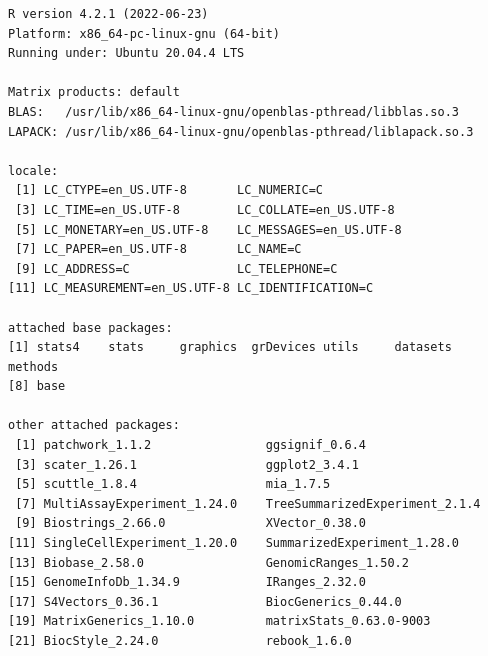 \documentclass[
]{book}
\begin{document}
\begin{verbatim}
R version 4.2.1 (2022-06-23)
Platform: x86_64-pc-linux-gnu (64-bit)
Running under: Ubuntu 20.04.4 LTS

Matrix products: default
BLAS:   /usr/lib/x86_64-linux-gnu/openblas-pthread/libblas.so.3
LAPACK: /usr/lib/x86_64-linux-gnu/openblas-pthread/liblapack.so.3

locale:
 [1] LC_CTYPE=en_US.UTF-8       LC_NUMERIC=C              
 [3] LC_TIME=en_US.UTF-8        LC_COLLATE=en_US.UTF-8    
 [5] LC_MONETARY=en_US.UTF-8    LC_MESSAGES=en_US.UTF-8   
 [7] LC_PAPER=en_US.UTF-8       LC_NAME=C                 
 [9] LC_ADDRESS=C               LC_TELEPHONE=C            
[11] LC_MEASUREMENT=en_US.UTF-8 LC_IDENTIFICATION=C       

attached base packages:
[1] stats4    stats     graphics  grDevices utils     datasets  methods  
[8] base     

other attached packages:
 [1] patchwork_1.1.2                ggsignif_0.6.4                
 [3] scater_1.26.1                  ggplot2_3.4.1                 
 [5] scuttle_1.8.4                  mia_1.7.5                     
 [7] MultiAssayExperiment_1.24.0    TreeSummarizedExperiment_2.1.4
 [9] Biostrings_2.66.0              XVector_0.38.0                
[11] SingleCellExperiment_1.20.0    SummarizedExperiment_1.28.0   
[13] Biobase_2.58.0                 GenomicRanges_1.50.2          
[15] GenomeInfoDb_1.34.9            IRanges_2.32.0                
[17] S4Vectors_0.36.1               BiocGenerics_0.44.0           
[19] MatrixGenerics_1.10.0          matrixStats_0.63.0-9003       
[21] BiocStyle_2.24.0               rebook_1.6.0                  


\end{verbatim}
\end{document}
